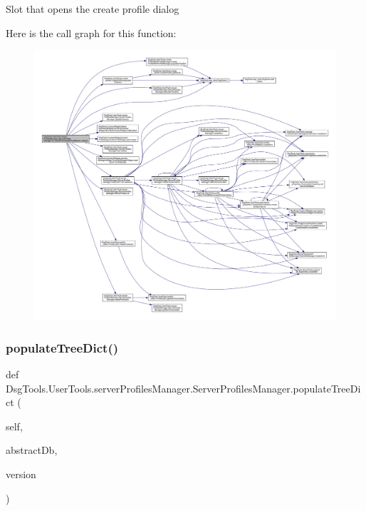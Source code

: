 \begin{DoxyVerb}Slot that opens the create profile dialog
\end{DoxyVerb}
 Here is the call graph for this function\+:
\nopagebreak
\begin{figure}[H]
\begin{center}
\leavevmode
\includegraphics[width=350pt]{class_dsg_tools_1_1_user_tools_1_1server_profiles_manager_1_1_server_profiles_manager_a840814bdb284ff84c78d680cbe2f84f7_cgraph}
\end{center}
\end{figure}
\mbox{\label{class_dsg_tools_1_1_user_tools_1_1server_profiles_manager_1_1_server_profiles_manager_a7f949bfd945cb37076a785e7d4292b88}} 
\subsubsection{\texorpdfstring{populate\+Tree\+Dict()}{populateTreeDict()}}
{\footnotesize\ttfamily def Dsg\+Tools.\+User\+Tools.\+server\+Profiles\+Manager.\+Server\+Profiles\+Manager.\+populate\+Tree\+Dict (\begin{DoxyParamCaption}\item[{}]{self,  }\item[{}]{abstract\+Db,  }\item[{}]{version }\end{DoxyParamCaption})}

